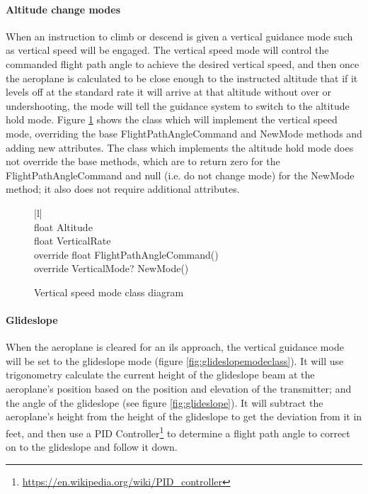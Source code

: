 \documentclass{article}
\begin{document}
\paragraph{Altitude change modes}
When an instruction to climb or descend is given a vertical guidance mode such as vertical speed will be engaged.
The vertical speed mode will control the commanded flight path angle to achieve the desired vertical speed, and then once the aeroplane is calculated to be close enough to the instructed altitude that if it levels off at the standard rate it will arrive at that altitude without over or undershooting, the mode will tell the guidance system to switch to the altitude hold mode.
Figure \ref{fig:verticalspeedmodeclass} shows the class which will implement the vertical speed mode, overriding the base FlightPathAngleCommand and NewMode methods and adding new attributes.
The class which implements the altitude hold mode does not override the base methods, which are to return zero for the FlightPathAngleCommand and null (i.e. do not change mode) for the NewMode method; it also does not require additional attributes.

\begin{figure}[H]
\centering
\begin{tabular}{ |l| } 
\hline
{} \\
\hline
float Altitude \\
float VerticalRate \\
\hline
override float FlightPathAngleCommand() \\
override VerticalMode? NewMode() \\
\hline
\end{tabular}
\caption{\label{fig:verticalspeedmodeclass}Vertical speed mode class diagram}
\end{figure}

\paragraph{Glideslope}
When the aeroplane is cleared for an \acrshort{ils} approach, the vertical guidance mode will be set to the glideslope mode (figure \ref{fig:glideslopemodeclass}).
It will use trigonometry calculate the current height of the glideslope beam at the aeroplane's position based on the position and elevation of the transmitter; and the angle of the glideslope (see figure \ref{fig:glideslope}).
It will subtract the aeroplane's height from the height of the glideslope to get the deviation from it in feet, and then use a PID Controller\footnote{\url{https://en.wikipedia.org/wiki/PID_controller}} to determine a flight path angle to correct on to the glideslope and follow it down.
\end{document}
